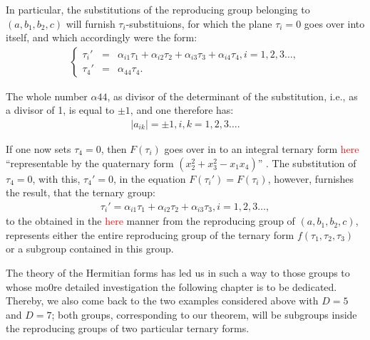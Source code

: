 In particular, the substitutions of the reproducing group belonging to $(a,b_1,b_2,c)$ will furnish $\tau_i$-substituions, for which the plane $\tau_i=0$ goes over into itself, and which accordingly were the form:
\begin{align}
\left\{\begin{array}{rcl}
\tau_i'&=&\alpha_{i1}\tau_1+\alpha_{i2}\tau_2+\alpha_{i3}\tau_3+\alpha_{i4}\tau_4, i=1,2,3\ldots,\\
\tau_4'&=&\alpha_{44}\tau_4.
\end{array}\right.
\end{align}

The whole number $\alpha{44}$, as divisor of the determinant of the substitution, i.e., as a divisor of 1, is equal to $\pm1$, and one therefore has:
\begin{align}
\left|a_{ik}\right|=\pm1, i,k=1,2,3\ldots.
\end{align}

If one now sets $\tau_4=0$, then $F(\tau_i)$ goes over in to an integral ternary form \textcolor{red}{here} “representable by the quaternary form $(x_2^2+x_3^2-x_1x_4)$” . The substitution of $\tau_4=0$, with this, $\tau_4'=0$, in the equation $F(\tau_i')=F(\tau_i)$, however, furnishes the result, that the ternary group:
\begin{align}
\tau_i'=\alpha_{i1}\tau_1+\alpha_{i2}\tau_2+\alpha_{i3}\tau_3, i=1,2,3\ldots,
\end{align}
to the obtained in the \textcolor{red}{here} manner from the reproducing group of $(a,b_1,b_2,c)$, represents either the entire reproducing group of the ternary form $f(\tau_1,\tau_2,\tau_3)$ or a subgroup contained in this group.


The theory of the Hermitian forms has led us in such a way to those groups to whose mo0re detailed investigation the following chapter is to be dedicated. Thereby, we also come back to the two examples considered above with $D=5$ and $D=7$; both groups, corresponding to our theorem, will be subgroups inside the reproducing groups of two particular ternary forms.


